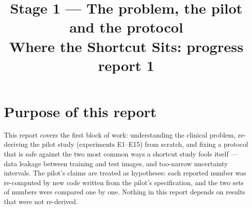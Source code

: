 

\newcommand{\notY}{1 = melanoma}
\newcommand{\notA}{a ruler scale bar (synthetic, pasted) or hair (real)}
\newcommand{\notROI}{the skin lesion (manual or U-Net lesion mask)}
\newcommand{\notCross}{$[\text{mask}-\text{ERM}]_{\text{outside}}-[\text{mask}-\text{ERM}]_{\text{inside}}$ of reversed-test AUROC: in the ruler sweep the \emph{location interaction} $[\cdot]_{r=0}-[\cdot]_{r=1}$; in the real hair traps Trap~B $-$ Trap~A.}
\newcommand{\notCI}{95\% crossed seed$\times$image bootstrap interval (Sec.~\ref{sec:bootstrap}); every interval in this report uses it.}
\newcommand{\notExtra}{}
\title{\textbf{Stage 1 --- The problem, the pilot and the protocol}\\[3pt]\large Where the Shortcut Sits: progress report 1}
\author{}
\date{}

\maketitle
{}


\tableofcontents
\clearpage

\section{Purpose of this report}
This report covers the first block of work: understanding the clinical problem, re-deriving the pilot study
(experiments E1--E15) from scratch, and fixing a protocol that is safe against the two most common ways a shortcut
study fools itself --- data leakage between training and test images, and too-narrow uncertainty intervals. The
pilot's claims are treated as hypotheses: each reported number was re-computed by new code written from the pilot's
specification, and the two sets of numbers were compared one by one. Nothing in this report depends on results that
were not re-derived.

